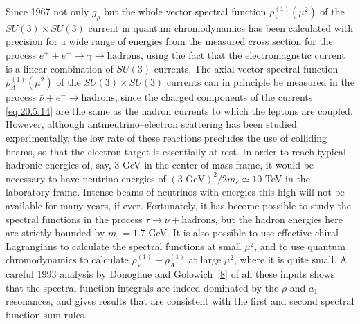 Since 1967 not only $g_\rho$ but the whole vector spectral function $\rho_V^{(1)}(\mu^2)$ of the $SU(3)\times SU(3)$ current in quantum chromodynamics has been calculated with precision for a wide range of energies from the measured cross section for the process $e^++e^-\to\gamma\to\text{hadrons}$, using the fact that the electromagnetic current is a linear combination of $SU(3)$ currents. The axial-vector spectral function $\rho_A^{(1)}(\mu^2)$ of the $SU(3)\times SU(3)$ currents can in principle be measured in the process $\bar\nu+e^-\to\text{hadrons}$, since the charged components of the currents \eqref{eq:20.5.14} are the same as the hadron currents to which the leptons are coupled. However, although antineutrino--electron scattering has been studied experimentally, the low rate of these reactions precludes the use of colliding beams, so that the electron target is essentially at rest. In order to reach typical hadronic energies of, say, 3 GeV in the center-of-mass frame, it would be necessary to have neutrino energies of $(3\text{ GeV})^2/2m_e\simeq10$ TeV in the laboratory frame. Intense beams of neutrinos with energies this high will not be available for many years, if ever. Fortunately, it has become possible to study the spectral functions in the process $\tau\to\nu+\text{hadrons}$, but the hadron energies here are strictly bounded by $m_\tau=1.7$ GeV. It is also possible to use effective chiral Lagrangians to calculate the spectral functions at small $\mu^2$, and to use quantum chromodynamics to calculate $\rho_V^{(1)}-\rho_A^{(1)}$ at large $\mu^2$, where it is quite small. A careful 1993 analysis by Donoghue and Golowich~\hyperref[ch20-ref-8]{[8]} of all these inputs shows that the spectral function integrals are indeed dominated by the $\rho$ and $a_1$ resonances, and gives results that are consistent with the first and second spectral function sum rules.

